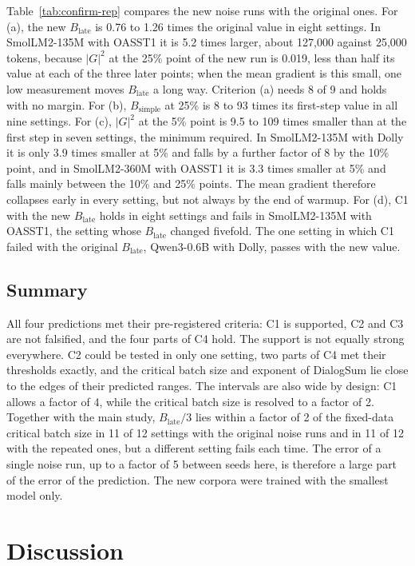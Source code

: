 \documentclass[10pt]{article}
\newcommand{\bsimple}{B_{\mathrm{simple}}}
\newcommand{\blate}{B_{\mathrm{late}}}
\begin{document}
Table~\ref{tab:confirm-rep} compares the new noise runs with the original ones. For (a), the new $\blate$ is 0.76 to 1.26 times the original value in eight settings. In SmolLM2-135M with OASST1 it is 5.2 times larger, about 127,000 against 25,000 tokens, because $|G|^2$ at the 25\% point of the new run is 0.019, less than half its value at each of the three later points; when the mean gradient is this small, one low measurement moves $\blate$ a long way. Criterion (a) needs 8 of 9 and holds with no margin. For (b), $\bsimple$ at 25\% is 8 to 93 times its first-step value in all nine settings. For (c), $|G|^2$ at the 5\% point is 9.5 to 109 times smaller than at the first step in seven settings, the minimum required. In SmolLM2-135M with Dolly it is only 3.9 times smaller at 5\% and falls by a further factor of 8 by the 10\% point, and in SmolLM2-360M with OASST1 it is 3.3 times smaller at 5\% and falls mainly between the 10\% and 25\% points. The mean gradient therefore collapses early in every setting, but not always by the end of warmup. For (d), C1 with the new $\blate$ holds in eight settings and fails in SmolLM2-135M with OASST1, the setting whose $\blate$ changed fivefold. The one setting in which C1 failed with the original $\blate$, Qwen3-0.6B with Dolly, passes with the new value.

\subsection{Summary}

All four predictions met their pre-registered criteria: C1 is supported, C2 and C3 are not falsified, and the four parts of C4 hold. The support is not equally strong everywhere. C2 could be tested in only one setting, two parts of C4 met their thresholds exactly, and the critical batch size and exponent of DialogSum lie close to the edges of their predicted ranges. The intervals are also wide by design: C1 allows a factor of 4, while the critical batch size is resolved to a factor of 2. Together with the main study, $\blate/3$ lies within a factor of 2 of the fixed-data critical batch size in 11 of 12 settings with the original noise runs and in 11 of 12 with the repeated ones, but a different setting fails each time. The error of a single noise run, up to a factor of 5 between seeds here, is therefore a large part of the error of the prediction. The new corpora were trained with the smallest model only.

\section{Discussion}\label{sec:discussion}
\end{document}
